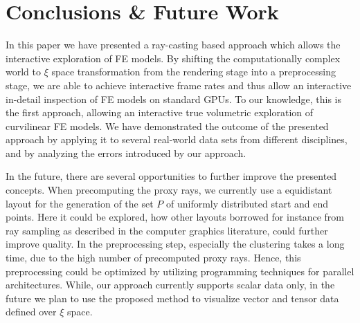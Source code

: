 \documentclass[review,journal]{vgtc}         %
\begin{document}
\section{Conclusions \& Future Work}\label{sec:conclusions}
In this paper we have presented a ray-casting based approach which allows the interactive exploration of FE models. By shifting the computationally complex world to $\xi$ space transformation from the rendering stage into a preprocessing stage, we are able to achieve interactive frame rates and thus allow an interactive in-detail inspection of FE models on standard GPUs. To our knowledge, this is the first approach, allowing an interactive true volumetric exploration of curvilinear FE models. We have demonstrated the outcome of the presented approach by applying it to several real-world data sets from different disciplines, and by analyzing the errors introduced by our approach.

In the future, there are several opportunities to further improve the presented concepts. When precomputing the proxy rays, we currently use a equidistant layout for the generation of the set $P$ of uniformly distributed start and end points. Here it could be explored, how other layouts borrowed for instance from ray sampling as described in the computer graphics literature, could further improve quality. In the preprocessing step, especially the clustering takes a long time, due to the high number of precomputed proxy rays. Hence, this preprocessing could be optimized by utilizing programming techniques for parallel architectures. While, our approach currently supports scalar data only, in the future we plan to use the proposed method to visualize vector and tensor data defined over $\xi$ space.




\end{document}
